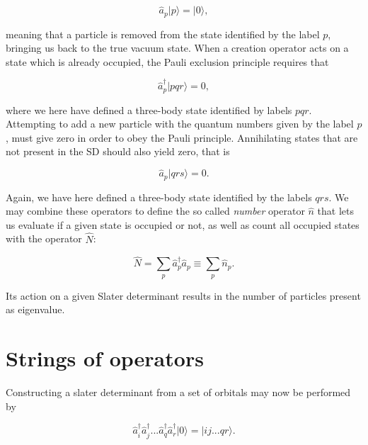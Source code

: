 \begin{equation}
\hat{a}_p \vert p \rangle = \vert 0 \rangle,
\label{eqn:annihilation}
\end{equation}

meaning that a particle is removed from the state identified by the label $p$, bringing us back to the true vacuum state.
When a creation operator acts on a state which is already occupied, the Pauli exclusion principle requires that 


\begin{equation}
\hat{a}_p^\dagger \vert pqr \rangle = 0,
\label{eqn:createExclusion}
\end{equation}

where we here have defined a three-body state identified by labels $pqr$. Attempting to add a new particle with the quantum numbers given by the label $p$, must give zero in order to obey the Pauli principle.  
Annihilating states that are not present in the SD should also yield zero, that is

\begin{equation}
\hat{a}_p \vert qrs \rangle = 0.
\label{eqn:annihilateExclusion}
\end{equation}

Again, we have here defined a three-body state identified by the labels $qrs$. 
We may combine these operators to define the so called \emph{number} operator $\hat{n}$ that lets us evaluate if a given state is occupied or not, as well as count all occupied states with the operator $\hat{N}$:

\begin{equation}
\hat{N} = \sum_p\hat{a}_p^\dagger \hat{a}_p \equiv \sum_p \hat{n}_p. 
\label{eqn:numberop}
\end{equation}

Its action on a given Slater determinant results in the number of particles present as eigenvalue. 

\section{Strings of operators}

Constructing a slater determinant from a set of orbitals may now be performed by 

\begin{equation}
\hat{a}_i^\dagger \hat{a}_j^\dagger  ... \hat{a}_q^\dagger \hat{a}_r^\dagger \vert 0 \rangle = \vert ij ... qr \rangle.
\label{eqn:createSD}
\end{equation}

